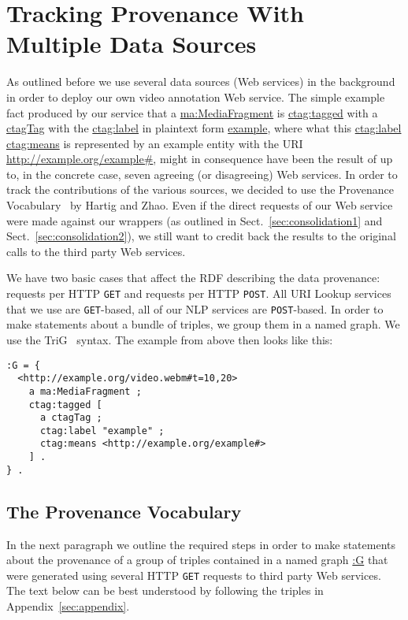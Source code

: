 \documentclass{acm_proc_article-sp}
\begin{document}
\section{Tracking Provenance With Multiple Data Sources}\label{sec:tracking}
As outlined before we use several data sources (Web services) in the background in order to deploy our own video annotation Web service. The simple example fact produced by our service that a \url{ma:MediaFragment} is \url{ctag:tagged} with a \url{ctagTag} with the \url{ctag:label} in plaintext form \url{example}, where what this \url{ctag:label} \url{ctag:means} is represented by an example entity with the URI \url{http://example.org/example#}, might in consequence have been the result of up to, in the concrete case, seven agreeing (or disagreeing) Web services. In order to track the contributions of the various sources, we decided to use the Provenance Vocabulary~\cite{Hartig:Provenance} by Hartig and Zhao. Even if the direct requests of our Web service were made against our wrappers (as outlined in Sect.~\ref{sec:consolidation1} and Sect.~\ref{sec:consolidation2}), we still want to credit back the results to the original calls to the third party Web services. 

We have two basic cases that affect the RDF describing the data provenance: requests per HTTP \texttt{GET} and requests per HTTP \texttt{POST}. All URI Lookup services that we use are \texttt{GET}-based, all of our NLP services are \texttt{POST}-based. In order to make statements about a bundle of triples, we group them in a named graph. We use the TriG~\cite{Bizer:TriG} syntax. The example from above then looks like this:
\begin{lstlisting}
:G = {
  <http://example.org/video.webm#t=10,20> 
    a ma:MediaFragment ;
    ctag:tagged [
      a ctagTag ;
      ctag:label "example" ;
      ctag:means <http://example.org/example#> 
    ] .  
} .
\end{lstlisting}

\subsection{The Provenance Vocabulary}\label{sec:provenance}
In the next paragraph we outline the required steps in order to make statements about the provenance of a group of triples contained in a named graph \url{:G} that were generated using several HTTP \texttt{GET} requests to third party Web services. The text below can be best understood by following the triples in Appendix~\ref{sec:appendix}.
\end{document}
